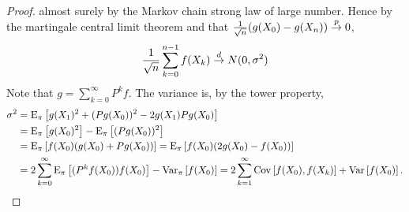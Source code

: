 \begin{proof}
    almost surely by the Markov chain strong law of large number. Hence 
    by the martingale central limit theorem and that $\frac{1}{\sqrt{n}}(g(X_0)-g(X_n))\overset{p}{\to} 0$,  
    \begin{equation*}
        \frac{1}{\sqrt{n}}\sum_{k=0}^{n-1} f(X_k) \overset{d}{\to} N(0, \sigma^2)
    \end{equation*}
    Note that $g = \sum_{k=0}^\infty P^kf$. The variance is, by the tower property,  
    \begin{equation*}
        \begin{split}
            \sigma^2 &= \operatorname{E}_\pi\left[ {g(X_1)^2 + (Pg(X_0))^2 - 2g(X_1)Pg(X_0)} \right] \\
            &= \operatorname{E}_\pi\left[ {g(X_0)^2} \right] - \operatorname{E}_\pi\left[ {(Pg(X_0))^2} \right]\\ 
            &= \operatorname{E}_\pi\left[ {f(X_0)(g(X_0) + Pg(X_0))} \right] 
            = \operatorname{E}_\pi\left[ {f(X_0)(2g(X_0) - f(X_0))} \right] \\ 
            &= 2\sum_{k=0}^\infty\operatorname{E}_\pi\left[ {(P^kf(X_0))f(X_0)} \right] - \operatorname{Var}_\pi\left[ {f(X_0)} \right] 
            = 2\sum_{k=1}^\infty\operatorname{Cov}\left[ {f(X_0), f(X_k)} \right] + \operatorname{Var}\left[ {f(X_0)} \right]. 
        \end{split}
    \end{equation*}
\end{proof}